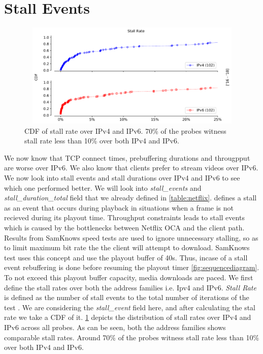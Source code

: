 \section{Stall Events}
\begin{figure}[!ht]
	\centering
	\includegraphics[keepaspectratio, height=5cm, width=15cm]{figures/stall/netflix-stall-rate-probes-cdf.pdf}
	\caption[Stall Rate CDF]{CDF of stall rate over IPv4 and IPv6. 70\% of the probes witness stall rate less than 10\% over both IPv4 and IPv6.}
	\label{fig:Stall Rate CDF}
\end{figure}
We now know that TCP connect times, prebuffering durations and througpput are worse over IPv6. We also know that clients prefer to stream videos over IPv6. 
We now look into stall events and stall durations over IPv4 and IPv6 to see which one performed better. We will look into \textit{stall\_events} and \textit{stall\_duration\_total} field that we already defined in \cref{table:netflix}.
\cite{bajpaimeasuring} defines a stall as an event that occurs during playback in situations when a frame is not recieved during its playout time. 
Throughput constraints leads to stall events which is caused by the bottlenecks between Netflix OCA and the client path. Results from SamKnows speed tests \cite{bajpaipam} are used to ignore unnecessary
stalling, so as to limit maximum bit rate the the client will attempt to download. SamKnows test uses this concept and use the playout buffer of 40s. Thus, incase of a stall event
rebuffering is done before resuming the playout timer \cref{fig:sequencediagram}. To not exceed this playout buffer capacity, media downloads are paced. 
We first define the stall rates over both the address families i.e. Ipv4 and IPv6.  \textit{Stall Rate} is defined as the number of stall events to the total number of iterations of the test \cite{bajpaimeasuring}. 
We are considering the \textit{stall\_event} field here, and after calculating the stal rate we take a CDF of it.
\cref{fig:Stall Rate CDF} depicts the distribution of stall rates over IPv4 and IPv6 across all probes. As can be seen, both the address families shows comparable stall rates. Around 70\% of the probes witness stall rate less than 10\% over both IPv4 and IPv6.
